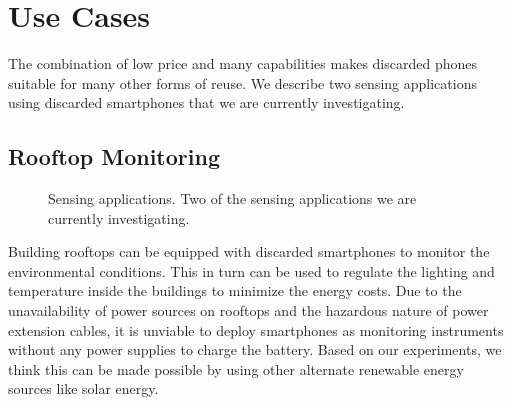 \section{Use Cases}
\label{sec-usecases}
The combination of low price and many capabilities makes discarded phones
suitable for many other forms of reuse. 
We describe two sensing applications using discarded smartphones that we are
currently investigating.
\subsection{Rooftop Monitoring}
\begin{figure}[t]
  \centering
  \quad


  \vspace*{-0.1in}

  \caption{\small Sensing applications.
  \textnormal{Two of the sensing applications we are currently investigating.}}

  \vspace*{-0.1in}

\end{figure}
Building rooftops can be equipped with discarded smartphones to monitor the
environmental conditions. This in turn can be used to regulate the lighting and
temperature inside the buildings to minimize the energy costs.
Due to the unavailability of power sources on rooftops and the hazardous nature of
power extension cables, it is unviable to deploy smartphones as monitoring
instruments without any power supplies to charge the battery.
Based on our experiments, we think this can be made possible by using other
alternate renewable energy sources like solar energy.

